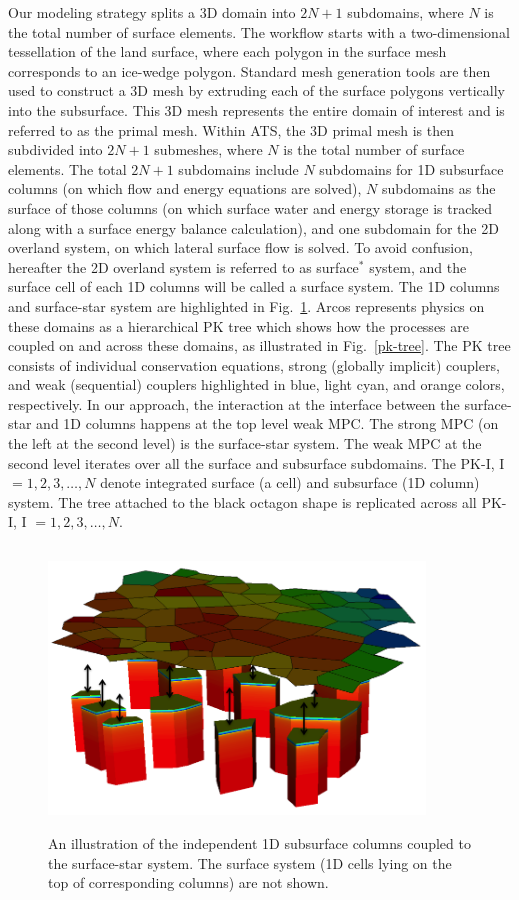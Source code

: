 \documentclass[review]{elsarticle}
\begin{document}
Our modeling strategy splits a 3D domain into $2N + 1$ subdomains, where $N$ is the total number of surface elements.  The workflow starts with a two-dimensional tessellation of the land surface, where each polygon in the surface mesh corresponds to an ice-wedge polygon. Standard mesh generation tools are then used to construct a 3D mesh by extruding each of the surface polygons vertically into the subsurface. This 3D mesh represents the entire domain of interest and is referred to as the primal mesh. Within ATS, the 3D primal mesh is then subdivided into $2N+1$ submeshes, where $N$ is the total number of surface elements. The total $2N+1$ subdomains include $N$ subdomains for 1D subsurface columns (on which flow and energy equations are solved), $N$ subdomains as the surface of those columns (on which surface water and energy storage is tracked along with a surface energy balance calculation), and one subdomain for the 2D overland system, on which lateral surface flow is solved.  To avoid confusion, hereafter the 2D overland system is referred to as surface$^*$ system, and the surface cell of each 1D columns will be called a surface system. The 1D columns and surface-star system are highlighted in Fig.~\ref{surf-cols}. Arcos represents physics on these domains as a hierarchical PK tree which shows how the processes are coupled on and across these domains, as illustrated in Fig.~\ref{pk-tree}. The PK tree consists of individual conservation equations, strong (globally implicit) couplers, and weak (sequential) couplers highlighted in blue, light cyan, and orange colors, respectively. In our approach, the interaction at the interface between the surface-star and 1D columns happens at the top level weak MPC. The strong MPC (on the left at the second level) is the surface-star system. The weak MPC at the second level iterates over all the surface and subsurface subdomains. The PK-I, I $=1,2,3, \dots, N$ denote integrated surface (a cell) and subsurface (1D column) system. The tree attached to the black octagon shape is replicated across all PK-I, I $=1,2,3, \dots, N$.

\begin{figure}[!htpb]
\centering
\includegraphics[height = 7.5cm, width=10cm]{figures/mixed-dim-model.png}
\caption{An illustration of the independent 1D subsurface columns coupled to the surface-star system. The surface system (1D cells lying on the top of corresponding columns) are not shown.}
\label{surf-cols}
\end{figure}
\end{document}
